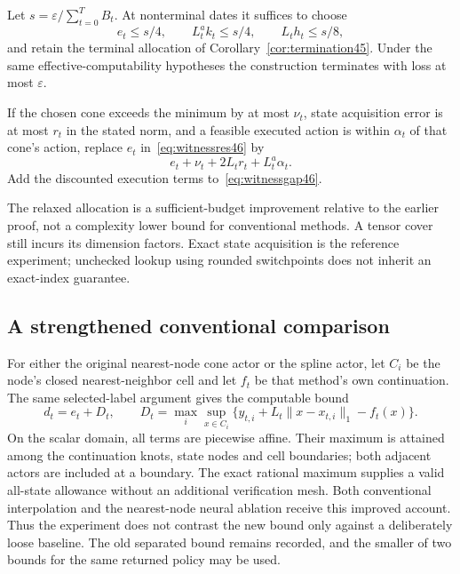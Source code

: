 \begin{corollary}\label{cor:witness46}
Let $s=\varepsilon/\sum_{t=0}^TB_t$. At nonterminal dates it suffices to choose
\[
 e_t\le s/4,\qquad L_t^ak_t\le s/4,\qquad L_th_t\le s/8,
\]
and retain the terminal allocation of Corollary~\ref{cor:termination45}. Under the same effective-computability hypotheses the construction terminates with loss at most $\varepsilon$.

If the chosen cone exceeds the minimum by at most $\nu_t$, state acquisition error is at most $r_t$ in the stated norm, and a feasible executed action is within $\alpha_t$ of that cone's action, replace $e_t$ in~\eqref{eq:witnessres46} by
\[
 e_t+\nu_t+2L_tr_t+L_t^a\alpha_t.
\]
Add the discounted execution terms to~\eqref{eq:witnessgap46}.
\end{corollary}
The relaxed allocation is a sufficient-budget improvement relative to the earlier proof, not a complexity lower bound for conventional methods. A tensor cover still incurs its dimension factors. Exact state acquisition is the reference experiment; unchecked lookup using rounded switchpoints does not inherit an exact-index guarantee.

\subsection{A strengthened conventional comparison}
For either the original nearest-node cone actor or the spline actor, let $C_i$ be the node's closed nearest-neighbor cell and let $f_t$ be that method's own continuation. The same selected-label argument gives the computable bound
\begin{equation}\label{eq:nearest46}
 d_t=e_t+D_t,\qquad
 D_t=\max_i\sup_{x\in C_i}
       \{y_{t,i}+L_t\|x-x_{t,i}\|_1-f_t(x)\}.
\end{equation}
On the scalar domain, all terms are piecewise affine. Their maximum is attained among the continuation knots, state nodes and cell boundaries; both adjacent actors are included at a boundary. The exact rational maximum supplies a valid all-state allowance without an additional verification mesh. Both conventional interpolation and the nearest-node neural ablation receive this improved account. Thus the experiment does not contrast the new bound only against a deliberately loose baseline. The old separated bound remains recorded, and the smaller of two bounds for the same returned policy may be used.

